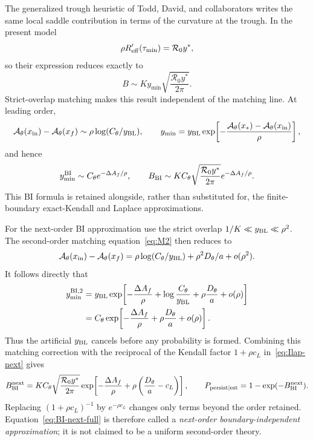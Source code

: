 \documentclass[11pt,a4paper]{article}
\newcommand{\Rzero}{\mathcal R_0}
\newcommand{\Afun}{\mathcal A_\theta}
\newcommand{\BL}{y_{\rm BL}}
\newcommand{\xf}{x_f}
\newcommand{\xs}{x_*}
\begin{document}
The generalized trough heuristic of Todd, David, and collaborators writes the
same local saddle contribution in terms of the curvature at the trough.  In
the present model
\[
 \rho R_{\rm eff}'(\tau_{\min})=\Rzero y^*,
\]
so their expression reduces exactly to
\begin{equation}
 B\sim K y_{\min}\sqrt{\frac{\Rzero y^*}{2\pi}}.
 \label{eq:generalized-trough}
\end{equation}
Strict-overlap matching makes this result independent of the matching line.
At leading order,
\[
 \Afun(x_{\rm in})-\Afun(\xf)
 \sim\rho\log(C_\theta/\BL),\qquad
 y_{\min}=\BL\exp\!\left[-\frac{\Afun(\xs)-\Afun(x_{\rm in})}{\rho}\right],
\]
and hence
\begin{equation}
 y_{\min}^{\rm BI}\sim C_\theta e^{-\Delta A_f/\rho},\qquad
 B_{\rm BI}\sim K C_\theta\sqrt{\frac{\Rzero y^*}{2\pi}}
 e^{-\Delta A_f/\rho}.
 \label{eq:BI-full}
\end{equation}
This BI formula is retained alongside, rather than substituted for, the
finite-boundary exact-Kendall and Laplace approximations.

For the next-order BI approximation use the strict overlap
$1/K\ll\BL\ll\rho^2$.  The second-order matching equation~\eqref{eq:M2} then
reduces to
\[
 \Afun(x_{\rm in})-\Afun(\xf)
 =\rho\log(C_\theta/\BL)+\rho^2D_\theta/a+o(\rho^2).
\]
It follows directly that
\begin{align}
 y_{\min}^{\mathrm{BI},2}
 &=\BL\exp\!\left[-\frac{\Delta A_f}{\rho}
 +\log\frac{C_\theta}{\BL}+\rho\frac{D_\theta}{a}+o(\rho)\right]\nonumber\\
 &=C_\theta\exp\!\left[-\frac{\Delta A_f}{\rho}
 +\rho\frac{D_\theta}{a}+o(\rho)\right].
 \label{eq:BI-ymin-next-full}
\end{align}
Thus the artificial $\BL$ cancels before any probability is formed.  Combining
this matching correction with the reciprocal of
the Kendall factor $1+\rho c_L$ in~\eqref{eq:Ilap-next} gives
\begin{equation}
 B_{\rm BI}^{\rm next}=K C_\theta\sqrt{\frac{\Rzero y^*}{2\pi}}
 \exp\!\left[-\frac{\Delta A_f}{\rho}
 +\rho\left(\frac{D_\theta}{a}-c_L\right)\right],
 \qquad P_{\rm persist\mid est}=1-\exp(-B_{\rm BI}^{\rm next}).
 \label{eq:BI-next-full}
\end{equation}
Replacing $(1+\rho c_L)^{-1}$ by $e^{-\rho c_L}$ changes only terms beyond the
order retained.  Equation~\eqref{eq:BI-next-full} is therefore called a
\emph{next-order boundary-independent approximation}; it is not claimed to be
a uniform second-order theory.
\end{document}
